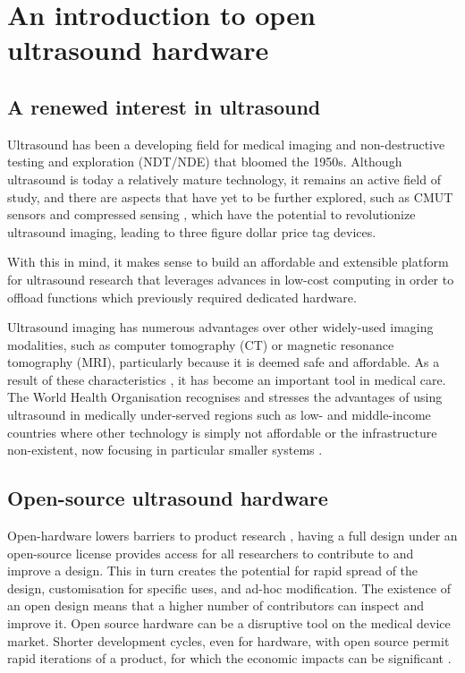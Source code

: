 \documentclass{article}
\begin{document}
\section{An introduction to open ultrasound hardware}

\subsection{A renewed interest in ultrasound}

Ultrasound has been a developing field for medical imaging and non-destructive testing and exploration (NDT/NDE) that bloomed the 1950s. Although ultrasound is today a relatively mature technology, it remains an active field of study, and  there are aspects that have yet to be further explored, such as CMUT sensors and compressed sensing \cite{kruizinga_compressive_2017, liebgott_compressive_2012}, which have the potential to revolutionize ultrasound imaging, leading to three figure dollar price tag devices.

With this in mind, it makes sense to build an affordable and extensible platform for ultrasound research that leverages advances in low-cost computing in order to offload functions which previously required dedicated hardware.

Ultrasound imaging has numerous advantages over other widely-used imaging modalities, such as computer tomography (CT) or magnetic resonance tomography (MRI), particularly because it is deemed safe and affordable. As a result of these characteristics \cite{kurjak_use_1986}, it has become an important tool in medical care. The World Health Organisation \cite{who_future_1985} recognises and stresses the advantages of using ultrasound in medically under-served regions such as low- and middle-income countries where other technology is simply not affordable or the infrastructure non-existent, now focusing in particular smaller systems \cite{kjeken_systematic_2011}.
 


\subsection{Open-source ultrasound hardware}

Open-hardware lowers barriers to product research \cite{pandey_open_2019}, having a full design under an open-source license provides access for all researchers to contribute to and improve a design. This in turn creates the potential for rapid spread of the design, customisation for specific uses, and ad-hoc modification. The existence of an open design means that a higher number of contributors can inspect and improve it. Open source hardware can be a disruptive tool on the medical device market. Shorter development cycles, even for hardware, with open source permit rapid iterations of a product, for which the economic impacts can be significant \cite{pearce_quantifying_2015, pearce_return_2016, moritz_economic_2019, winter_open_2019}.
\end{document}
